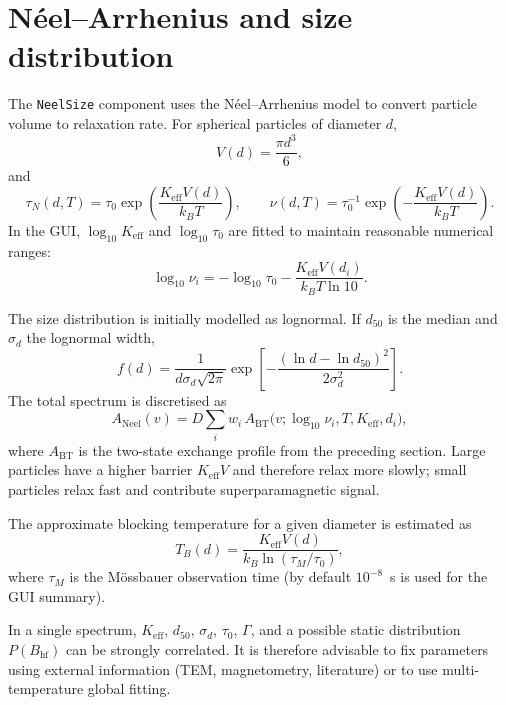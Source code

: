 \documentclass[11pt,a4paper]{article}
\newcommand{\BHF}{B_{\mathrm{hf}}}
\newcommand{\code}[1]{\texttt{\small #1}}
\begin{document}
\section{N\'{e}el--Arrhenius and size distribution}

The \code{NeelSize} component uses the N\'{e}el--Arrhenius model to convert
particle volume to relaxation rate. For spherical particles of diameter $d$,
\begin{equation}
  V(d)=\frac{\pi d^3}{6},
\end{equation}
and
\begin{equation}
  \tau_N(d,T)=\tau_0\exp\left(\frac{K_{\mathrm{eff}}V(d)}{k_B T}\right),
  \qquad
  \nu(d,T)=\tau_0^{-1}\exp\left(-\frac{K_{\mathrm{eff}}V(d)}{k_B T}\right).
\end{equation}
In the GUI, $\log_{10}K_{\mathrm{eff}}$ and $\log_{10}\tau_0$ are fitted to
maintain reasonable numerical ranges:
\begin{equation}
  \log_{10}\nu_i=-\log_{10}\tau_0
  -\frac{K_{\mathrm{eff}}V(d_i)}{k_BT\ln 10}.
\end{equation}

The size distribution is initially modelled as lognormal. If $d_{50}$ is the
median and $\sigma_d$ the lognormal width,
\begin{equation}
  f(d)=\frac{1}{d\sigma_d\sqrt{2\pi}}
  \exp\left[-\frac{(\ln d-\ln d_{50})^2}{2\sigma_d^2}\right].
\end{equation}
The total spectrum is discretised as
\begin{equation}
  A_{\mathrm{Neel}}(v)=D\sum_i w_i\,
  A_{\mathrm{BT}}\bigl(v;\log_{10}\nu_i,T,K_{\mathrm{eff}},d_i\bigr),
\end{equation}
where $A_{\mathrm{BT}}$ is the two-state exchange profile from the preceding
section. Large particles have a higher barrier $K_{\mathrm{eff}}V$ and therefore
relax more slowly; small particles relax fast and contribute superparamagnetic
signal.

The approximate blocking temperature for a given diameter is estimated as
\begin{equation}
  T_B(d)=\frac{K_{\mathrm{eff}}V(d)}{k_B\ln(\tau_M/\tau_0)},
\end{equation}
where $\tau_M$ is the M\"{o}ssbauer observation time (by default $10^{-8}$~s
is used for the GUI summary).

\begin{aviso}[Identifiability]
In a single spectrum, $K_{\mathrm{eff}}$, $d_{50}$, $\sigma_d$, $\tau_0$, $\Gamma$,
and a possible static distribution $P(\BHF)$ can be strongly correlated. It is
therefore advisable to fix parameters using external information
(TEM, magnetometry, literature) or to use multi-temperature global fitting.
\end{aviso}
\end{document}

